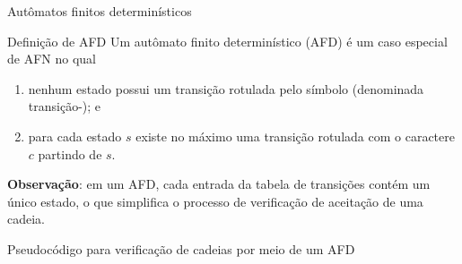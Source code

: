 \begin{frame}[fragile]{Autômatos finitos determinísticos}

    \begin{block}{Definição de AFD}
        Um autômato finito determinístico (AFD) é um caso especial de AFN no qual
        \begin{enumerate}
            \item nenhum estado possui um transição rotulada pelo símbolo  (denominada transição-); e
            \item para cada estado $s$ existe no máximo uma transição rotulada com o caractere $c$ partindo de $s$.
        \end{enumerate}
    \end{block}

    \vspace{0.2in}

    \textbf{Observação}: em um AFD, cada entrada da tabela de transições contém um único estado, o que simplifica o processo de verificação de aceitação de uma cadeia.
\end{frame}

\begin{frame}[fragile]{Pseudocódigo para verificação de cadeias por meio de um AFD}

    \begin{algorithmic}[1]
        \vspace{0.2in}
        \Statex
        \EndWhile
        \Statex
            \State {}
        \Else
            \State {}
        \EndIf
    \end{algorithmic}

\end{frame}

